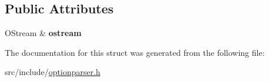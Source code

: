 \subsection*{Public Attributes}
\begin{DoxyCompactItemize}
\item 
\hypertarget{structxmem_1_1config_1_1third__party_1_1_print_usage_implementation_1_1_o_stream_writer_ab85a98667ea62652a59042c8ee354ab5}{}O\+Stream \& {\bfseries ostream}\label{structxmem_1_1config_1_1third__party_1_1_print_usage_implementation_1_1_o_stream_writer_ab85a98667ea62652a59042c8ee354ab5}

\end{DoxyCompactItemize}


The documentation for this struct was generated from the following file\+:\begin{DoxyCompactItemize}
\item 
src/include/\hyperlink{optionparser_8h}{optionparser.\+h}\end{DoxyCompactItemize}
